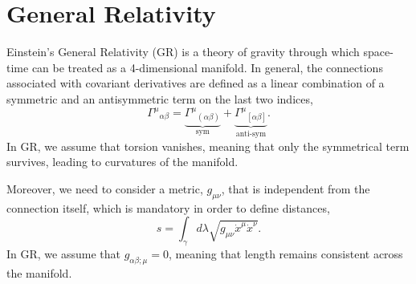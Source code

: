 \documentclass{book}
\begin{document}
	\section{General Relativity}
	Einstein's General Relativity (GR) is a theory of gravity through which space-time can be treated as a 4-dimensional manifold. In general, the connections associated with covariant derivatives are defined as a linear combination of a symmetric and an antisymmetric term on the last two indices,
	\begin{equation}
		\label{Connection_general}
		{\Gamma^\mu}_{\alpha\beta}=\underbrace{{\Gamma^\mu}_{(\alpha\beta)}}_{\text{sym}}+\underbrace{{\Gamma^\mu}_{\left[\alpha\beta\right]}}_{\text{anti-sym}}.
	\end{equation}
	In GR, we assume that torsion vanishes, meaning that only the symmetrical term survives, leading to curvatures of the manifold.
	
	Moreover, we  need to consider a metric, $g_{\mu\nu}$, that is independent from the connection itself, which is mandatory in order to define distances,
	\begin{equation}
		\label{general_metric_distance}
		s=\int_\gamma d\lambda \sqrt{g_{\mu\nu}\dot x^\mu \dot x^\nu}.
	\end{equation}
	In GR, we assume that $g_{\alpha\beta;\mu}=0$, meaning that length remains consistent across the manifold.
	
\end{document}
